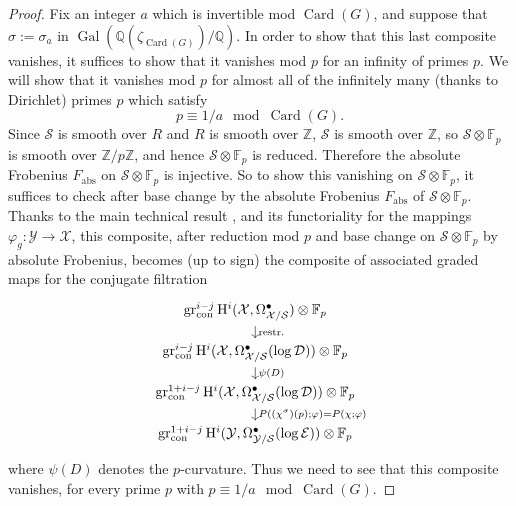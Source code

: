 \begin{proof}
Fix an integer \(a\) which is invertible mod \(\operatorname{Card}(G)\), and suppose that \(\sigma:=\sigma_a\) in \(\operatorname{Gal}(\mathbb{Q}(\zeta_{\operatorname{Card}(G)})/\mathbb{Q})\). In order to show that this last composite vanishes, it suffices to show that it vanishes mod \(p\) for an infinity of primes \(p\). We will show that it vanishes mod \(p\) for almost all of the infinitely many (thanks to Dirichlet) primes \(p\) which satisfy
\[
p\equiv 1/a\mod \operatorname{Card}(G).
\]
Since \(\mathcal{S}\) is smooth over \(R\) and \(R\) is smooth over \(\mathbb{Z}\), \(\mathcal{S}\) is smooth over \(\mathbb{Z}\), so \(\mathcal{S}\otimes\mathbb{F}_p\) is smooth over \(\mathbb{Z}/p\mathbb{Z}\), and hence \(\mathcal{S}\otimes\mathbb{F}_p\) is reduced. Therefore the absolute Frobenius \(F_{\mathrm{abs}}\) on \(\mathcal{S}\otimes\mathbb{F}_p\) is injective. So to show this vanishing on \(\mathcal{S}\otimes\mathbb{F}_p\), it suffices to check after base change by the absolute Frobenius \(F_{\mathrm{abs}}\) of \(\mathcal{S}\otimes\mathbb{F}_p\). Thanks to the main technical result \cite[3.2]{Ka-ASDE}, and its functoriality for the mappings \(\varphi_g:\mathcal{Y}\to\mathcal{X}\), this composite, after reduction mod \(p\) and base change on \(\mathcal{S}\otimes\mathbb{F}_p\) by absolute Frobenius, becomes (up to sign) the composite of associated graded maps for the conjugate filtration
\[
\begin{tikzcd}[column sep=large,row sep=small]
\operatorname{gr}^{i-j}_{\mathrm{con}}\mathrm{H}^i(\mathcal{X},\Omega^\bullet_{\mathcal{X}/\mathcal{S}})\otimes\mathbb{F}_p
\arrow[d,"\operatorname{restr.}"]\\
\operatorname{gr}^{i-j}_{\mathrm{con}}\mathrm{H}^i(\mathcal{X},\Omega^\bullet_{\mathcal{X}/\mathcal{S}}(\log\mathcal{D}))\otimes\mathbb{F}_p
\arrow[d,"\psi(D)"]\\
\operatorname{gr}^{1+i-j}_{\mathrm{con}}\mathrm{H}^i(\mathcal{X},\Omega^\bullet_{\mathcal{X}/\mathcal{S}}(\log\mathcal{D}))\otimes\mathbb{F}_p
\arrow[d,"P((\chi^\sigma)(p);\varphi)=P(\chi;\varphi)"]\\
\operatorname{gr}^{1+i-j}_{\mathrm{con}}\mathrm{H}^i(\mathcal{Y},\Omega^\bullet_{\mathcal{Y}/\mathcal{S}}(\log\mathcal{E}))\otimes\mathbb{F}_p
\end{tikzcd}
\]
where \(\psi(D)\) denotes the \(p\)-curvature. Thus we need to see that this composite vanishes, for every prime \(p\) with \(p\equiv 1/a\mod \operatorname{Card}(G)\).


\end{proof}
